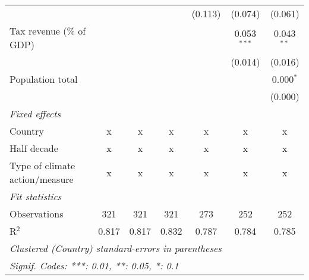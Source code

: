 \begin{tabular}{lcccccc}
                                                               &         &         &                & (0.113)        & (0.074)        & (0.061)\\   
   Tax revenue (\% of GDP)                                     &         &         &                &                & 0.053$^{***}$  & 0.043$^{**}$\\   
                                                               &         &         &                &                & (0.014)        & (0.016)\\   
   Population total                                            &         &         &                &                &                & 0.000$^{*}$\\   
                                                               &         &         &                &                &                & (0.000)\\   
   \emph{Fixed effects}\\
   Country                                                     & x       & x       & x              & x              & x              & x\\  
   Half decade                                                 & x       & x       & x              & x              & x              & x\\  
   Type of climate action/measure                              & x       & x       & x              & x              & x              & x\\  
   \midrule \emph{Fit statistics}\\
   Observations                                                & 321     & 321     & 321            & 273            & 252            & 252\\  
   R$^2$                                                       & 0.817   & 0.817   & 0.832          & 0.787          & 0.784          & 0.785\\  
   \midrule
   \multicolumn{7}{l}{\emph{Clustered (Country) standard-errors in parentheses}}\\
   \multicolumn{7}{l}{\emph{Signif. Codes: ***: 0.01, **: 0.05, *: 0.1}}\\
\end{tabular}
\par\endgroup


